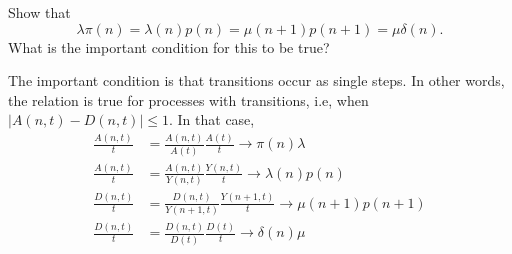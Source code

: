 \begin{question}
Show that 
\begin{equation*}
\lambda  \pi(n) = \lambda(n) p(n) = \mu(n+1) p(n+1) = \mu \delta(n).
\end{equation*}
What is the important condition for this to be true?
\begin{solution}
  The important condition is that transitions occur as single
  steps. In other words, the relation is true for processes with
   transitions, i.e, when $|A(n,t) - D(n,t)|\leq 1$.
  In  that case, 
\begin{align*}
  \frac{A(n,t)}{t} &=   \frac{A(n,t)}{A(t)} \frac{A(t)}{t} \to \pi(n) \lambda\\
  \frac{A(n,t)}{t} &=   \frac{A(n,t)}{Y(n,t)} \frac{Y(n,t)}{t} \to \lambda(n)p(n)\\
  \frac{D(n,t)}{t} &=   \frac{D(n,t)}{Y(n+1,t)} \frac{Y(n+1,t)}{t} \to \mu(n+1)p(n+1)\\
  \frac{D(n,t)}{t} &=   \frac{D(n,t)}{D(t)} \frac{D(t)}{t} \to \delta(n)\mu\\
\end{align*}
\end{solution}
\end{question}




